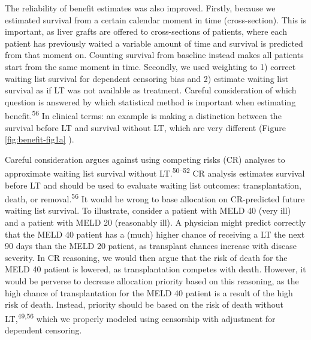 \documentclass[11pt,english,]{book} %
\begin{document}
The reliability of benefit estimates was also improved. Firstly, because we estimated survival from a certain calendar moment in time (cross-section). This is important, as liver grafts are offered to cross-sections of patients, where each patient has previously waited a variable amount of time and survival is predicted from that moment on. Counting survival from baseline instead makes all patients start from the same moment in time. Secondly, we used weighting to 1) correct waiting list survival for dependent censoring bias and 2) estimate waiting list survival as if LT was not available as treatment. Careful consideration of which question is answered by which statistical method is important when estimating benefit.\textsuperscript{56} In clinical terms: an example is making a distinction between the survival before LT and survival without LT, which are very different (Figure \ref{fig:benefit-fig1a} ).

Careful consideration argues against using competing risks (CR) analyses to approximate waiting list survival without LT.\textsuperscript{50--52} CR analysis estimates survival before LT and should be used to evaluate waiting list outcomes: transplantation, death, or removal.\textsuperscript{56} It would be wrong to base allocation on CR-predicted future waiting list survival. To illustrate, consider a patient with MELD 40 (very ill) and a patient with MELD 20 (reasonably ill). A physician might predict correctly that the MELD 40 patient has a (much) higher chance of receiving a LT the next 90 days than the MELD 20 patient, as transplant chances increase with disease severity. In CR reasoning, we would then argue that the risk of death for the MELD 40 patient is lowered, as transplantation competes with death. However, it would be perverse to decrease allocation priority based on this reasoning, as the high chance of transplantation for the MELD 40 patient is a result of the high risk of death. Instead, priority should be based on the risk of death without LT,\textsuperscript{49,56} which we properly modeled using censorship with adjustment for dependent censoring.
\end{document}
